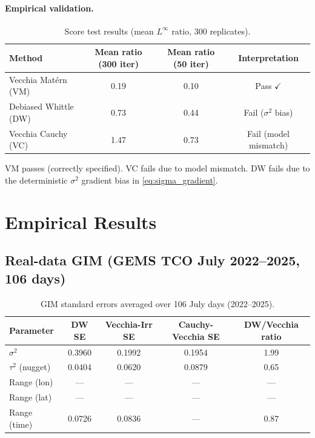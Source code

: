 \documentclass[12pt]{article}
\begin{document}
\paragraph{Empirical validation.}

\begin{table}[h]
\centering
\caption{Score test results (mean $L^\infty$ ratio, 300 replicates).}
\begin{tabular}{lccc}
\toprule
Method & Mean ratio (300 iter) & Mean ratio (50 iter) & Interpretation \\
\midrule
Vecchia Matérn (VM) & 0.19 & 0.10 & Pass $\checkmark$ \\
Debiased Whittle (DW) & 0.73 & 0.44 & Fail ($\sigma^2$ bias) \\
Vecchia Cauchy (VC) & 1.47 & 0.73 & Fail (model mismatch) \\
\bottomrule
\end{tabular}
\label{tab:score_test}
\end{table}

VM passes (correctly specified).
VC fails due to model mismatch.
DW fails due to the deterministic $\sigma^2$ gradient bias
in \eqref{eq:sigma_gradient}.


\section{Empirical Results}
\label{sec:empirical}

\subsection{Real-data GIM (GEMS TCO July 2022--2025, 106 days)}

\begin{table}[h]
\centering
\caption{GIM standard errors averaged over 106 July days (2022--2025).}
\begin{tabular}{lcccc}
\toprule
Parameter & DW SE & Vecchia-Irr SE & Cauchy-Vecchia SE & DW/Vecchia ratio \\
\midrule
$\sigma^2$ & 0.3960 & 0.1992 & 0.1954 & 1.99 \\
$\tau^2$ (nugget) & 0.0404 & 0.0620 & 0.0879 & 0.65 \\
Range (lon) & --- & --- & --- & --- \\
Range (lat) & --- & --- & --- & --- \\
Range (time) & 0.0726 & 0.0836 & --- & 0.87 \\
\bottomrule
\end{tabular}
\label{tab:gim}
\end{table}
\end{document}
